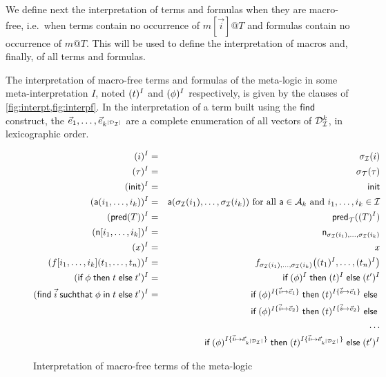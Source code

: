 We define next the interpretation of terms and formulas when they are
macro-free, i.e.\ when terms contain no occurrence of $m[\vec{i}]@T$
and formulas contain no occurrence of $m@T$. This will be used to
define the interpretation of macros and, finally, of all terms
and formulas.

\begin{definition}
  The interpretation of macro-free terms and formulas of the meta-logic in
  some meta-interpretation $I$, noted $(t)^I$ and $(\phi)^I$
  respectively, is given by the clauses of \cref{fig:interpt,fig:interpf}.
  In the interpretation of a term built using the $\mathsf{find}$
  construct, the $\vec{e}_1, \ldots, \vec{e}_{k^{|\mathcal{D}_{\mathcal{I}}|}}$ are a complete
  enumeration of all vectors of $\mathcal{D}_{\mathcal{I}}^k$, in lexicographic order.
\end{definition}

\begin{figure}[t]
  \begin{eqnarray*}
    (i)^I &=& \sigma_{\mathcal{I}}(i)
    \\
    (\tau)^I &=& \sigma_{\mathcal{T}}(\tau) \\
    (\mathsf{init})^I &=& \mathsf{init} \\
    (\textsf{a}(i_1,\ldots,i_k))^I &=&
      \textsf{a}(\sigma_{\mathcal{I}}(i_1),\ldots,\sigma_{\mathcal{I}}(i_k))
      \text{ for all }
      \textsf{a}\in\mathcal{A}_k \text{ and } i_1,\ldots,i_k\in \mathcal{I} \\
    (\textsf{pred}(T))^I &=&
      \mathsf{pred}_{\mathcal{T}}((T)^I)
    \\
    (\mathsf{n}[i_1,\ldots,i_k])^I &=& \mathsf{n}_{\sigma_{\mathcal{I}}(i_1),\ldots,\sigma_{\mathcal{I}}(i_k)}
    \\
    (x)^{I} &=& x
    \\
    (f[i_1,\ldots,i_k](t_1,\ldots,t_n))^{I} &=&
    f_{\sigma_{\mathcal{I}}(i_1),\ldots,\sigma_{\mathcal{I}}(i_k)}\bigl(
      (t_1)^{I},\ldots,(t_n)^{I}
    \bigr)
    \\
    (\textsf{if}\; \phi \;\textsf{then}\; t \;\textsf{else}\; t')^I &=&
    \textsf{if}\; (\phi)^I \;\textsf{then}\; (t)^I \;\textsf{else}\; (t')^I
    \\
    (\textsf{find}\; \vec{i} \;\textsf{suchthat}\; \phi \;\textsf{in}\; t \;\textsf{else}\; t')^I &=&
    \textsf{if}\; (\phi)^{I\{\vec{i}\mapsto\vec{e}_1\}}
    \;\textsf{then}\; (t)^{I\{\vec{i}\mapsto\vec{e}_1\}}
    \;\textsf{else}\; \\ & &
    \textsf{if}\; (\phi)^{I\{\vec{i}\mapsto\vec{e}_2\}}
    \;\textsf{then}\; (t)^{I\{\vec{i}\mapsto\vec{e}_2\}}
    \;\textsf{else}\; \\ & & \ldots \\ & &
    \textsf{if}\; (\phi)^{I\{\vec{i}\mapsto\vec{e}_{k^{|\mathcal{D}_{\mathcal{I}}|}}\}}
    \;\textsf{then}\; (t)^{I\{\vec{i}\mapsto\vec{e}_{k^{|\mathcal{D}_{\mathcal{I}}|}}\}}
    \;\textsf{else}\; (t')^I
  \end{eqnarray*}
  \caption{Interpretation of macro-free terms of the meta-logic}
  \label{fig:interpt}
\end{figure}

